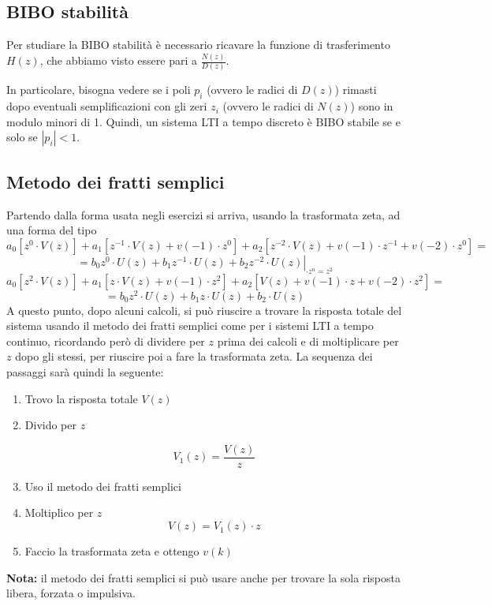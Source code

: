 \documentclass[a4paper,oneside,titlepage]{book}
\begin{document}
\subsection{BIBO stabilità}
Per studiare la BIBO stabilità è necessario ricavare la funzione di trasferimento $H(z)$, che abbiamo visto essere pari a $\frac{N(z)}{D(z)}$.

In particolare, bisogna vedere se i poli $p_i$ (ovvero le radici di $D(z)$) rimasti dopo eventuali semplificazioni con gli zeri $z_i$ (ovvero le radici di $N(z)$) sono in modulo minori di 1. Quindi, un sistema LTI a tempo discreto è BIBO stabile se e solo se $|p_i|<1$.

\subsection{Metodo dei fratti semplici}
Partendo dalla forma usata negli esercizi si arriva, usando la trasformata zeta, ad una forma del tipo
\[ a_0 [z^0 \cdot V(z)] + a_1 [z^{-1} \cdot V(z) + v(-1) \cdot z^0] + a_2 [z^{-2} \cdot V(z) + v(-1) \cdot z^{-1} + v(-2) \cdot z^0] = \]
\[ \left. = b_0 z^0 \cdot U(z) + b_1 z^{-1} \cdot U(z) + b_2 z^{-2} \cdot U(z) \right|_{\cdot z^n = z^2} \]
\[ a_0 [z^2 \cdot V(z)] + a_1 [z \cdot V(z) + v(-1) \cdot z^2] + a_2 [V(z) + v(-1) \cdot z + v(-2) \cdot z^2] = \]
\[ = b_0 z^2 \cdot U(z) + b_1 z \cdot U(z) + b_2 \cdot U(z) \]
A questo punto, dopo alcuni calcoli, si può riuscire a trovare la risposta totale del sistema usando il metodo dei fratti semplici come per i sistemi LTI a tempo continuo, ricordando però di dividere per $z$ prima dei calcoli e di moltiplicare per $z$ dopo gli stessi, per riuscire poi a fare la trasformata zeta. La sequenza dei passaggi sarà quindi la seguente:
\begin{enumerate}
\item Trovo la risposta totale $V(z)$

\item Divido per $z$

\[ V_1(z) = \frac{V(z)}{z} \]

\item Uso il metodo dei fratti semplici

\item Moltiplico per $z$
\[ V(z) = V_1(z) \cdot z \]

\item Faccio la trasformata zeta e ottengo $v(k)$
\end{enumerate}
\textbf{Nota:}
il metodo dei fratti semplici si può usare anche per trovare la sola risposta libera, forzata o impulsiva.
\end{document}
